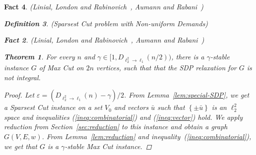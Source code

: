 \documentclass[twoside,leqno,twocolumn]{article}
\newcommand {\set}   [1] {\left\{ #1 \right\}}
\newtheorem{theorem}{Theorem}[section]
\newtheorem{Definition}[theorem]{Definition}
\newtheorem{fact}[theorem]{Fact}
\begin{document}
\begin{fact}{\sc (Linial, London and Rabinovich~\cite{LLR}, Aumann and Rabani~\cite{AR})}
\begin{Definition} {\sc (Sparsest Cut problem with Non-uniform Demands)}
\begin{fact}{\sc (Linial, London and Rabinovich~\cite{LLR}, Aumann and Rabani~\cite{AR})}
\begin{theorem}\label{thm:sdp-gap}
For every $n$ and $\gamma\in [1,D_{\ell_2^2\to \ell_1}(n/2))$, there is a $\gamma$-stable instance $G$ of Max Cut
on $2n$ vertices, such that that the SDP relaxation for $G$ is not integral.
\end{theorem}
\begin{proof}
Let $\varepsilon = (D_{\ell_2^2\to \ell_1}(n) - \gamma)/2$.
From Lemma~\ref{lem:special-SDP}, we get a Sparsest Cut instance on a set $V_0$ and vectors $\bar u$ such that 
$\set{\pm \bar u}$ is an $\ell_2^2$ space
and inequalities (\ref{ineq:combinatorial}) and (\ref{ineq:vector}) hold. 
We apply reduction from Section~\ref{sec:reduction} to this instance and obtain a graph $G(V,E, w)$.
From Lemma~\ref{lem:reduction} and inequality~(\ref{ineq:combinatorial}), we get that $G$ is a $\gamma$-stable Max Cut instance.


\end{proof}
\end{fact}
\end{Definition}
\end{fact}
\end{document}

